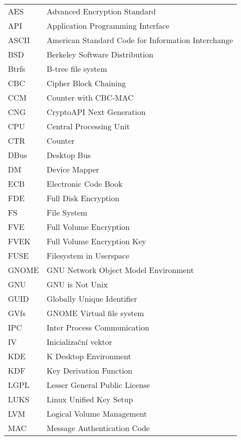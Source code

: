 
\seznamzkr

\setlength{\LTleft}{0pt}
\begin{longtable}{ll}
  AES & Advanced Encryption Standard \\
  API & Application Programming Interface \\
  ASCII & American Standard Code for Information Interchange \\
  BSD & Berkeley Software Distribution \\
  Btrfs & B-tree file system \\
  CBC & Cipher Block Chaining \\
  CCM & Counter with CBC-MAC \\
  CNG & CryptoAPI Next Generation \\
  CPU & Central Processing Unit \\
  CTR & Counter \\
  DBus & Desktop Bus \\
  DM & Device Mapper \\
  ECB & Electronic Code Book \\
  FDE & Full Disk Encryption \\
  FS &  File System \\
  FVE & Full Volume Encryption \\
  FVEK & Full Volume Encryption Key \\
  FUSE & Filesystem in Userspace \\
  GNOME & GNU Network Object Model Environment \\
  GNU & GNU is Not Unix \\
  GUID & Globally Unique Identifier \\
  GVfs & GNOME Virtual file system \\
  IPC & Inter Process Communication \\
  IV & Inicializační vektor \\
  KDE & K Desktop Environment \\
  KDF & Key Derivation Function \\
  LGPL & Lesser General Public License \\
  LUKS & Linux Unified Key Setup \\
  LVM & Logical Volume Management \\
  MAC & Message Authentication Code \\

\end{longtable}
